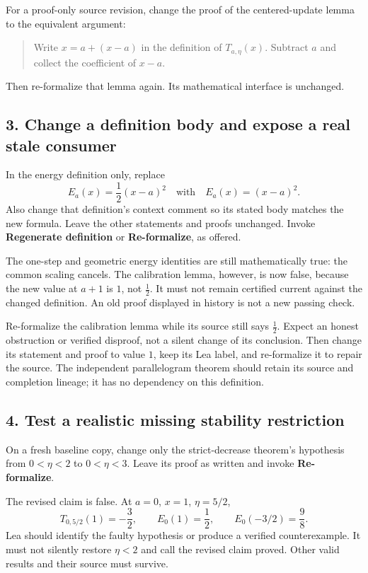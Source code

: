 \documentclass[11pt]{article}
\begin{document}
For a proof-only source revision, change the proof of the centered-update
lemma to the equivalent argument:
\begin{quote}
Write $x=a+(x-a)$ in the definition of $T_{a,\eta}(x)$.
Subtract $a$ and collect the coefficient of $x-a$.
\end{quote}
Then re-formalize that lemma again. Its mathematical interface is unchanged.

\subsection*{3. Change a definition body and expose a real stale consumer}
In the energy definition only, replace
\[
  E_a(x)=\frac12(x-a)^2
  \quad\text{with}\quad
  E_a(x)=(x-a)^2.
\]
Also change that definition's context comment so its stated body matches
the new formula. Leave the other statements and proofs unchanged.
Invoke \textbf{Regenerate definition} or \textbf{Re-formalize}, as offered.

The one-step and geometric energy identities are still mathematically true:
the common scaling cancels. The calibration lemma, however, is now false,
because the new value at $a+1$ is $1$, not $\frac12$.
It must not remain certified current against the changed definition.
An old proof displayed in history is not a new passing check.

Re-formalize the calibration lemma while its source still says $\frac12$.
Expect an honest obstruction or verified disproof, not a silent change
of its conclusion. Then change its statement and proof to value $1$,
keep its Lea label, and re-formalize it to repair the source.
The independent parallelogram theorem should retain its source and
completion lineage; it has no dependency on this definition.

\subsection*{4. Test a realistic missing stability restriction}
On a fresh baseline copy, change only the strict-decrease theorem's
hypothesis from $0<\eta<2$ to $0<\eta<3$.
Leave its proof as written and invoke \textbf{Re-formalize}.

The revised claim is false. At $a=0$, $x=1$, $\eta=5/2$,
\[
  T_{0,5/2}(1)=-\frac32,\qquad
  E_0(1)=\frac12,\qquad E_0(-3/2)=\frac98.
\]
Lea should identify the faulty hypothesis or produce a verified
counterexample. It must not silently restore $\eta<2$ and call the
revised claim proved. Other valid results and their source must survive.
\end{document}
